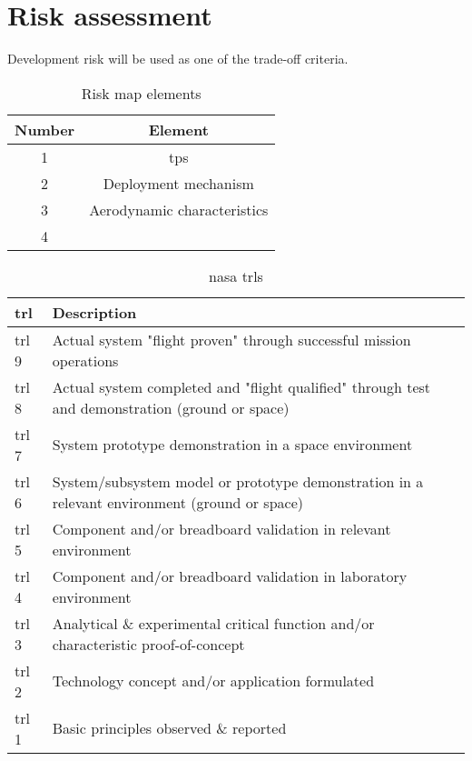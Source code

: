 \section{Risk assessment}
\label{ch:riskestimation}
Development risk will be used as one of the trade-off criteria. 

\begin{table}[h]
	\centering
	\caption{Risk map elements}
	\label{tab:riskmapelements}
	\begin{tabular}{|c|c|}
		\hline 
		\textbf{Number} & \textbf{Element} \\ \hline \hline
		1 & \acrlong{tps} \\
		2 & Deployment mechanism \\
		3 & Aerodynamic characteristics \\
		4 & \\
		\hline
	\end{tabular}
\end{table}

\begin{table}[h]
	\caption[\acrlong{nasa} ]{\gls{nasa} \glspl{trl} \cite{NASA2007}}
	\begin{tabular}{|p{}|p{}|}
		\hline
		\textbf{\acrfull{trl}} & \textbf{Description} \\ \hline \hline
		\gls{trl} 9& Actual system "flight proven" through successful mission operations\\
		\gls{trl} 8& Actual system completed and "flight qualified" through test and demonstration (ground or space)\\
		\gls{trl} 7& System prototype demonstration in a space environment\\
		\gls{trl} 6& System/subsystem model or prototype demonstration in a relevant environment (ground or space)\\
		\gls{trl} 5& Component and/or breadboard validation in relevant environment\\
		\gls{trl} 4& Component and/or breadboard validation in laboratory environment\\
		\gls{trl} 3& Analytical \& experimental critical function and/or characteristic proof-of-concept\\
		\gls{trl} 2& Technology concept and/or application formulated\\
		\gls{trl} 1& Basic principles observed \& reported \\
		\hline
	\end{tabular}
\end{table}

